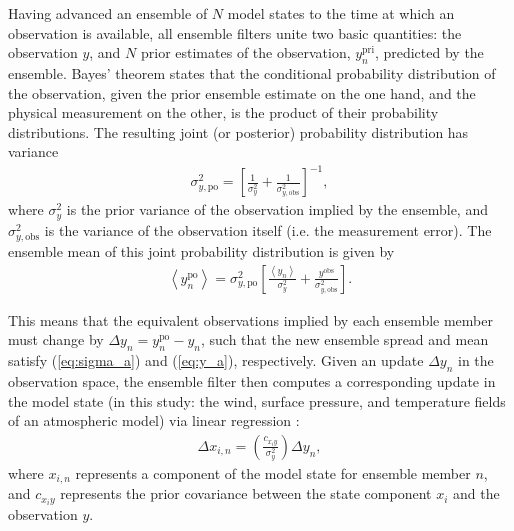 Having advanced an ensemble of $N$ model states to the time at which an observation is available, 
all ensemble filters unite two basic quantities: the observation $y$, and $N$ prior estimates of the observation, $y^{\text{pri}}_{n}$, predicted by the ensemble. 
Bayes' theorem states that the conditional probability distribution of the observation, given the prior ensemble estimate on the one hand, and the physical measurement on the other, is the product of their probability distributions.
The resulting joint (or posterior) probability distribution has variance 
\begin{eqnarray}
	\sigma_{y,{\text{po}}}^2 = 
\left[
	\frac{1}{\sigma_y^2}
	+
	\frac{1}{\sigma_{y,\text{obs}}^2}
\right]^{-1},
\label{eq:sigma_a}
\end{eqnarray}
where $\sigma_y^2$ is  the prior variance of the observation implied by the ensemble, 
and $\sigma_{y,\text{obs}}^2$ is the variance of the observation itself (i.e. the measurement error).
The ensemble mean of this joint probability distribution is given by
\begin{eqnarray}
	\left< y^{\text{po}}_n \right> = \sigma_{y,\text{po}}^2 
	\left[
		\frac{\left< y_n \right>}{\sigma_y^2} +
		\frac{y^{\text{obs}}}{\sigma_{y,\text{obs}}^2} 
	\right].
\label{eq:y_a}
\end{eqnarray}

This means that the equivalent observations implied by each ensemble member must change by $\Delta y_n =  y^{\text{po}}_n - y_n$, such that the new ensemble spread and mean satisfy (\ref{eq:sigma_a}) and (\ref{eq:y_a}), respectively.
Given an update $\Delta y_n$ in the observation space, the ensemble filter then computes a corresponding update in the model state (in this study: the wind, surface pressure, and temperature fields of an atmospheric model) via linear regression \citep{Anderson2003}:
\begin{eqnarray}
 \Delta x_{i,n} = 
\left(
	\frac{c_{x_iy}}{\sigma_y^2}
\right)
\Delta y_n,
\label{eq:state_update}
\end{eqnarray}
where $x_{i,n}$ represents a component of the model state for ensemble member $n$, and $c_{x_iy}$ represents the prior covariance between the state component $x_i$ and the observation $y$.

